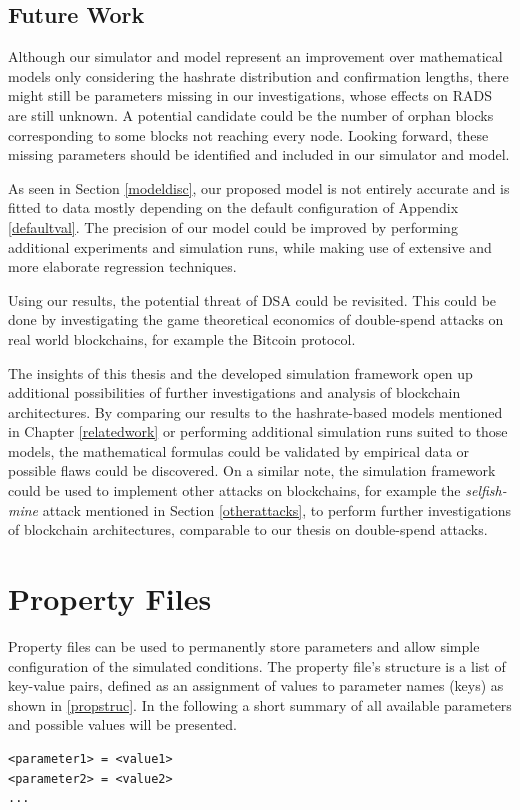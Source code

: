 \documentclass[a4paper,12pt,twoside]{report}
\begin{document}
\section{Future Work}
Although our simulator and model represent an improvement over mathematical models only considering the hashrate distribution and confirmation lengths, there might still be parameters missing in our investigations, whose effects on RADS are still unknown. A potential candidate could be the number of orphan blocks corresponding to some blocks not reaching every node. Looking forward, these missing parameters should be identified and included in our simulator and model.

As seen in Section \ref{modeldisc}, our proposed model is not entirely accurate and is fitted to data mostly depending on the default configuration of Appendix \ref{defaultval}. The precision of our model could be improved by performing additional experiments and simulation runs, while making use of extensive and more elaborate regression techniques.

Using our results, the potential threat of DSA could be revisited. This could be done by investigating the game theoretical economics of double-spend attacks on real world blockchains, for example the Bitcoin protocol.

The insights of this thesis and the developed simulation framework open up additional possibilities of further investigations and analysis of blockchain architectures. By comparing our results to the hashrate-based models mentioned in Chapter \ref{relatedwork} or performing additional simulation runs suited to those models, the mathematical formulas could be validated by empirical data or possible flaws could be discovered. On a similar note, the simulation framework could be used to implement other attacks on blockchains, for example the \textit{selfish-mine} attack mentioned in Section \ref{otherattacks}, to perform further investigations of blockchain architectures, comparable to our thesis on double-spend attacks. 



\appendix

\chapter{Property Files} \label{prop}
Property files can be used to permanently store parameters and allow simple configuration of the simulated conditions. The property file's structure is a list of key-value pairs, defined as an assignment of values to parameter names (keys) as shown in \autoref{propstruc}. In the following a short summary of all available parameters and possible values will be presented.
\begin{lstlisting}[caption=Property file structure,label=propstruc]
<parameter1> = <value1>
<parameter2> = <value2>
...
\end{lstlisting}
\end{document}
